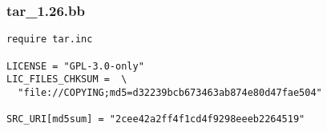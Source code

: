\begin{frame}[fragile]
  \frametitle{tar\_1.26.bb}
  \begin{block}{}
    \begin{verbatim}
require tar.inc

LICENSE = "GPL-3.0-only"
LIC_FILES_CHKSUM =  \
  "file://COPYING;md5=d32239bcb673463ab874e80d47fae504"

SRC_URI[md5sum] = "2cee42a2ff4f1cd4f9298eeeb2264519"
    \end{verbatim}
  \end{block}
\end{frame}
